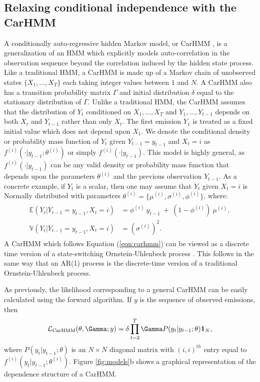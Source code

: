 \subsection{Relaxing conditional independence with the CarHMM}
\label{subsec:CarHMM}

A conditionally auto-regressive hidden Markov model, or CarHMM \citep{Lawler:2019}, is a generalization of an HMM which explicitly models auto-correlation in the observation sequence beyond the correlation induced by the hidden state process. Like a traditional HMM, a CarHMM is made up of a Markov chain of unobserved states $\{X_1,\ldots,X_T\}$ each taking integer values between $1$ and $N$. A CarHMM also has a transition probability matrix $\Gamma$ and initial distribution $\delta$ equal to the stationary distribution of $\Gamma$. Unlike a traditional HMM, the CarHMM assumes that the distribution of $Y_t$ conditioned on $X_1,\ldots, X_T$ and $Y_1,\ldots, Y_{t-1}$ depends on both $X_t$ and $Y_{t-1}$ rather than only $X_t$. The first emission $Y_1$ is treated as a fixed initial value which does not depend upon $X_1$. We denote the conditional density or probability mass function of $Y_t$ given $Y_{t-1} = y_{t-1}$ and $X_t=i$ as $f^{(i)}(\cdot | y_{t-1}; \theta^{(i)})$ or simply $f^{(i)}(\cdot | y_{t-1})$. This model is highly general, as $f^{(i)}(\cdot | y_{t-1})$ can be any valid density or probability mass function that depends upon the parameters $\theta^{(i)}$ and the previous observation $Y_{t-1}$. 
As a concrete example, if $Y_t$ is a scalar, then one may assume that $Y_t$ given $X_t = i$ is Normally distributed with parameters $\theta^{(i)} = \{\mu^{(i)},\sigma^{(i)},\phi^{(i)}\}$, where:
%
\begin{align}
\label{eqn:carhmm}
\begin{split}
\mathbb{E}(Y_{t}|Y_{t-1} = y_{t-1},X_t=i) &= \phi^{(i)} ~ y_{t-1} ~+ ~(1-\phi^{(i)})  ~\mu^{(i)}, \\
\mathbb{V}(Y_t| Y_{t-1} = y_{t-1},X_t=i) &= (\sigma^{(i)})^2.
\end{split}
\end{align}
%
A CarHMM which follows Equation (\ref{eqn:carhmm}) can be viewed as a discrete time version of a state-switching Ornstein-Uhlenbeck process \citep{Michelot:2019}. This follows in the same way that an AR(1) process is the discrete-time version of a traditional Ornstein-Uhlenbeck process. 

As previously, the likelihood corresponding to a general CarHMM can be easily calculated using the forward algorithm. If $y$ is the sequence of observed emissions, then
\begin{equation*}
    \calL_{\text{CarHMM}}(\theta,\Gamma;y) = \delta \prod_{t=2}^T \Gamma P(y_t|y_{t-1};\theta) \mathbf{1}_N,
    \label{eqn:CarHMM_likelihood}
\end{equation*}
where
%
$P(y_t|y_{t-1};\theta)$ is an $N \times N$ diagonal matrix with $(i,i)^{th}$ entry equal to $f^{(i)}(y_t|y_{t-1}; \theta^{(i)})$. Figure \ref{fig:models}b shows a graphical representation of the dependence structure of a CarHMM. 


